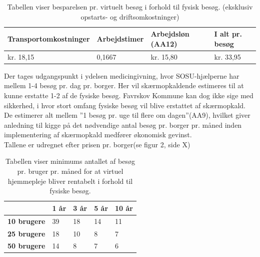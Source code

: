 \begin{table}[H]
	\caption{Tabellen viser besparelsen pr. virtuelt besøg i forhold til fysisk besøg. (eksklusiv opstarts- og driftsomkostninger)}
	\centering
	\label{tab:tabelbesparelse}
	\begin{tabular}{|l|l|l|l|}
		\hline
		\textbf{Transportomkostninger} & \textbf{Arbejdstimer } & \textbf{Arbejdsløn (AA12)} & \textbf{I alt pr. besøg}\\ \hline
		kr. 18,15 & 0,1667 & kr. 15,80 & kr. 33,95\\ \hline
	\end{tabular}
\end{table}
Der tages udgangspunkt i ydelsen medicingivning, hvor SOSU-hjælperne har mellem 1-4 besøg pr. dag pr. borger. Her vil skærmopkaldende estimeres til at kunne erstatte 1-2 af de fysiske besøg. Favrskov Kommune kan dog ikke sige med sikkerhed, i hvor stort omfang fysiske besøg vil blive erstattet af skærmopkald.\\
De estimerer alt mellem ”1 besøg pr. uge til flere om dagen”(AA9), hvilket giver anledning til kigge på det nødvendige antal besøg pr. borger pr. måned inden implementering af skærmopkald medfører økonomisk gevinst.\\
Tallene er udregnet efter prisen pr. borger(se figur 2, side X)

\begin{table}[H]
	\caption{Tabellen viser minimums antallet af besøg pr. bruger pr. måned for at virtuel hjemmepleje bliver rentabelt i forhold til fysiske besøg.}
	\centering
	\label{tab:tabelminimum}
	\begin{tabular}{|l|l|l|l|l|}
		\hline
		 & \textbf{1 år} & \textbf{3 år} & \textbf{5 år} & \textbf{10 år}\\ \hline
		\textbf{10 brugere} & 39 & 18 & 14 & 11\\ \hline
		\textbf{25 brugere} & 18 & 10 & 8 & 7\\ \hline
		\textbf{50 brugere} & 14 & 8 & 7 & 6\\ \hline
	\end{tabular}
\end{table}
